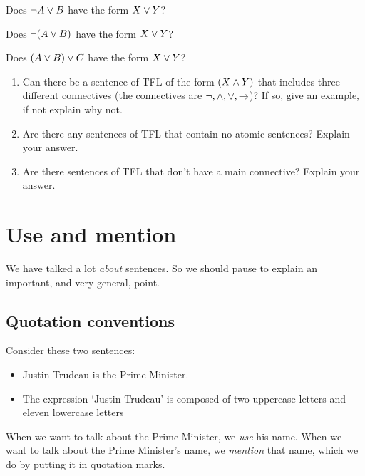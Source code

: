 \begin{practiceproblems}
\problempart
\begin{earg}
	\item  Does $\neg A\vee B$ have the form $X\vee Y$?
	\item Does $\neg(A\vee B)$ have the form $X\vee Y$?
	\item Does $(A\vee B)\vee C$ have the form $X\vee Y$?
\end{earg}
\problempart
\begin{enumerate}
	\item Can there be a sentence of TFL of the form $(X\mathbin{\wedge}Y)$ that includes three different connectives (the connectives are $\neg,\mathbin{\wedge},\vee,\rightarrow$)? If so, give an example, if not explain why not.
	\item Are there any sentences of TFL that contain no atomic sentences? Explain your answer.
	\\
			\item Are there sentences of TFL that don't have a main connective? Explain your answer.
\end{enumerate}

\end{practiceproblems}


\chapter{Use and mention}\label{s:UseMention}
We have talked a lot \emph{about} sentences. So we should pause to explain an important, and very general, point.

\section{Quotation conventions}
Consider these two sentences:
	\begin{itemize}
		\item Justin Trudeau is the Prime Minister.
		\item The expression `Justin Trudeau' is composed of two uppercase letters and eleven lowercase letters
	\end{itemize}
When we want to talk about the Prime Minister, we \emph{use} his name. When we want to talk about the Prime Minister's name, we \emph{mention} that name, which we do by putting it in quotation marks.

